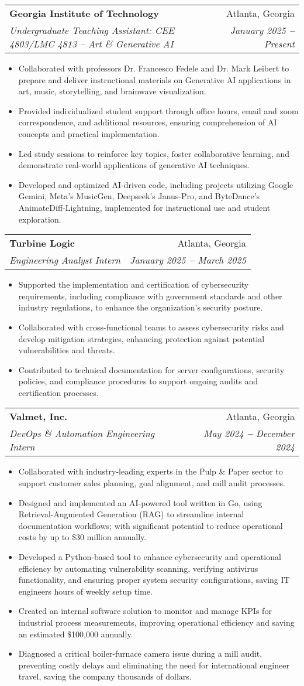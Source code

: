 \documentclass[letterpaper,11pt]{article}
\makeatletter
\newcommand{\resumeItem}[1]{
  \item\small{
    {#1 \vspace{-2pt}}
  }
}
\newcommand{\resumeSubheading}[4]{
  \vspace{-2pt}\item
    \begin{tabular*}{0.97\textwidth}[t]{l@{\extracolsep{\fill}}r}
      \textbf{#1} & #2 \\
      \textit{\small#3} & \textit{\small #4} \\
    \end{tabular*}\vspace{-7pt}
}
\newcommand{\resumeItemListStart}{\begin{itemize}}
\newcommand{\resumeItemListEnd}{\end{itemize}\vspace{-5pt}}
\makeatother
\begin{document}
    \resumeSubheading
    {Georgia Institute of Technology}{Atlanta, Georgia}
    {Undergraduate Teaching Assistant: CEE 4803/LMC 4813 – Art \& Generative AI}{January 2025 \textbf{--} Present}
      \resumeItemListStart
        \resumeItem{Collaborated with professors Dr. Francesco Fedele and Dr. Mark Leibert to prepare and deliver instructional materials on Generative AI applications in art, music, storytelling, and brainwave visualization.}
        \resumeItem{Provided individualized student support through office hours, email and zoom correspondence, and additional resources, ensuring comprehension of AI concepts and practical implementation.}
        \resumeItem{Led study sessions to reinforce key topics, foster collaborative learning, and demonstrate real-world applications of generative AI techniques.}
        \resumeItem{Developed and optimized AI-driven code, including projects utilizing Google Gemini, Meta's MusicGen, Deepseek's Janus-Pro, and ByteDance's AnimateDiff-Lightning, implemented for instructional use and student exploration.}
      \resumeItemListEnd

    \resumeSubheading
    {Turbine Logic}{Atlanta, Georgia}
    {Engineering Analyst Intern}{January 2025 \textbf{--} March 2025}
    \resumeItemListStart
    \resumeItem{Supported the implementation and certification of cybersecurity requirements, including compliance with government standards and other industry regulations, to enhance the organization's security posture.}
    \resumeItem{Collaborated with cross-functional teams to assess cybersecurity risks and develop mitigation strategies, enhancing protection against potential vulnerabilities and threats.}
    \resumeItem{Contributed to technical documentation for server configurations, security policies, and compliance procedures to support ongoing audits and certification processes.}
    \resumeItemListEnd

\resumeSubheading
    {Valmet, Inc.}{Atlanta, Georgia}
    {DevOps \& Automation Engineering Intern}{May 2024 \textbf{--} December 2024}
    \resumeItemListStart
    \resumeItem{Collaborated with industry-leading experts in the Pulp \& Paper sector to support customer sales planning, goal alignment, and mill audit processes.}
    \resumeItem{Designed and implemented an AI-powered tool written in Go, using Retrieval-Augmented Generation (RAG) to streamline internal documentation workflows; with significant potential to reduce operational costs by up to \$30 million annually.}
    \resumeItem{Developed a Python-based tool to enhance cybersecurity and operational efficiency by automating vulnerability scanning, verifying antivirus functionality, and ensuring proper system security configurations, saving IT engineers hours of weekly setup time.}
    \resumeItem{Created an internal software solution to monitor and manage KPIs for industrial process measurements, improving operational efficiency and saving an estimated \$100,000 annually.}
    \resumeItem{Diagnosed a critical boiler-furnace camera issue during a mill audit, preventing costly delays and eliminating the need for international engineer travel, saving the company thousands of dollars.}
    \resumeItemListEnd
    
\end{document}

